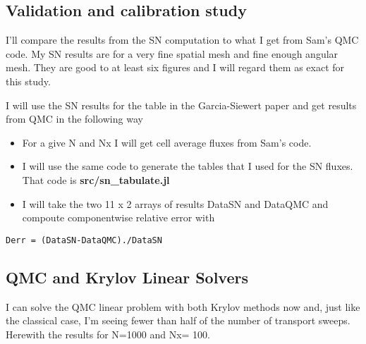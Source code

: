 \subsection{Validation and calibration study}
\label{validation-and-calibration-study}

I'll compare the results from the SN computation to what I get from
Sam's QMC code. My SN results are for a very fine spatial mesh and fine
enough angular mesh. They are good to at least six figures and I will
regard them as exact for this study.

I will use the SN results for the table in the Garcia-Siewert paper and
get results from QMC in the following way

\begin{itemize}
\item
  For a give N and Nx I will get cell average fluxes from Sam's code.
\item
  I will use the same code to generate the tables that I used for the SN
  fluxes. That code is \textbf{src/sn\_tabulate.jl}
\item
  I will take the two 11 x 2 arrays of results DataSN and DataQMC and
  compoute componentwise relative error with
\end{itemize}

\begin{verbatim}
Derr = (DataSN-DataQMC)./DataSN
\end{verbatim}

\subsection{QMC and Krylov Linear Solvers}
\label{qmc-and-krylov-linear-solvers}

I can solve the QMC linear problem with both Krylov methods now and,
just like the classical case, I'm seeing fewer than half of the number
of transport sweeps. Herewith the results for N=1000 and Nx= 100.





